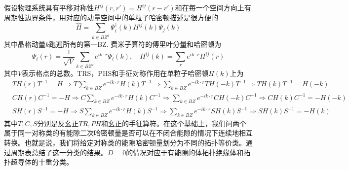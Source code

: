 \documentclass{article}
\numberwithin{equation}{subsection}
\begin{document}
假设物理系统具有平移对称性$H^{ij}(r,r')=H^{ij}(r-r')$和在每一个空间方向上有周期性边界条件，用对应的动量空间中的单粒子哈密顿描述是很方便的
\begin{equation}
    \hat{H}=\sum_{k\in BZ^d}\Psi_i^\dagger(k)H^{ij}(k)\Psi_j(k)
\end{equation}
其中晶格动量$k$跑遍所有的第一BZ. 费米子算符的傅里叶分量和哈密顿为
\begin{equation}
    \Psi_i(r)=\frac{1}{\sqrt{V}}\sum_{k\in BZ^d}e^{ik\cdot r}\Psi_i(k),\quad H^{ij}(k)=\sum_{r}e^{ik\cdot r}H^{ij}(r)
\end{equation}
其中$V$表示格点的总数。TRS，PHS和手征对称作用在单粒子哈密顿$H(k)$上为
\begin{equation}
    \begin{split}
        &TH(r)T^{-1}=H\Rightarrow T\sum_{k\in BZ}e^{-ik\cdot r}H(k)T^{-1}\Rightarrow\sum_{k\in BZ}e^{-ik\cdot r}TH(-k)T^{-1}\Rightarrow TH(k)T^{-1}=H(-k)\\
        &CH(r)C^{-1}=-H\Rightarrow C\sum_{k\in BZ}e^{-ik\cdot r}H(k)C^{-1}\Rightarrow\sum_{k\in BZ}e^{-ik\cdot r}CH(-k)C^{-1}\Rightarrow CH(k)C^{-1}=-H(-k)\\
        &SH(r)S^{-1}=-H\Rightarrow S\sum_{k\in BZ}e^{-ik\cdot r}H(k)S^{-1}\Rightarrow\sum_{k\in BZ}e^{-ik\cdot r}SH(k)S^{-1}\Rightarrow SH(k)S^{-1}=-H(k)
    \end{split}
\end{equation}
其中$T,C,S$分别是反幺正$TR,PH$和幺正的手征算符。在这个基础上，我们问两个属于同一对称类的有能隙二次哈密顿量是否可以在不闭合能隙的情况下连续地相互转换。也就是说，我们将给定对称类的能隙哈密顿量划分为不同的拓扑等价类。通过周期表总结了这一分类的结果。$D=0$的情况对应于有能隙的体拓扑绝缘体和拓扑超导体的十重分类。
\end{document}

